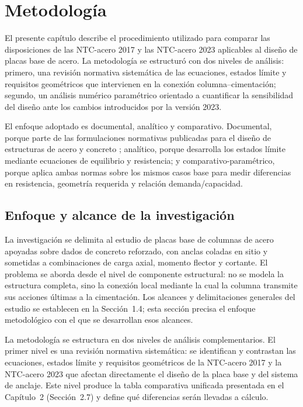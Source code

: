 \chapter{Metodología}

El presente capítulo describe el procedimiento utilizado para comparar las disposiciones de las
NTC-acero 2017 y las NTC-acero 2023 aplicables al diseño de placas base de acero. La metodología
se estructuró con dos niveles de análisis: primero, una revisión normativa sistemática de las
ecuaciones, estados límite y requisitos geométricos que intervienen en la conexión
columna--cimentación; segundo, un análisis numérico paramétrico orientado a cuantificar la
sensibilidad del diseño ante los cambios introducidos por la versión 2023.

El enfoque adoptado es documental, analítico y comparativo. Documental, porque parte de las
formulaciones normativas publicadas para el diseño de estructuras de acero y concreto
\cite{GCDMX_NTC_DCEA_2017,GCDMX_NTC_DCEA_2023,GCDMX_2023_concrete}; analítico, porque desarrolla
los estados límite mediante ecuaciones de equilibrio y resistencia; y comparativo-paramétrico,
porque aplica ambas normas sobre los mismos casos base para medir diferencias en resistencia,
geometría requerida y relación demanda/capacidad.

\section{Enfoque y alcance de la investigación}

La investigación se delimita al estudio de placas base de columnas de acero apoyadas sobre dados
de concreto reforzado, con anclas coladas en sitio y sometidas a combinaciones de carga axial,
momento flector y cortante. El problema se aborda desde el nivel de componente estructural: no se
modela la estructura completa, sino la conexión local mediante la cual la columna transmite sus
acciones últimas a la cimentación. Los alcances y delimitaciones generales del estudio se
establecen en la Sección~1.4; esta sección precisa el enfoque metodológico con el que se
desarrollan esos alcances.

La metodología se estructura en dos niveles de análisis complementarios. El primer nivel es una
revisión normativa sistemática: se identifican y contrastan las ecuaciones, estados límite y
requisitos geométricos de la NTC-acero 2017 y la NTC-acero 2023 que afectan directamente el diseño
de la placa base y del sistema de anclaje. Este nivel produce la tabla comparativa unificada
presentada en el Capítulo~2 (Sección~2.7) y define qué diferencias serán llevadas a cálculo.

